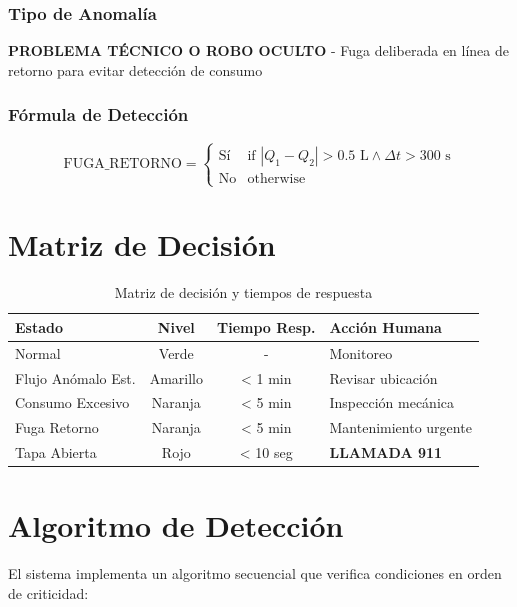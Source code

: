 \documentclass[12pt,a4paper,oneside]{report}
\begin{document}
\subsubsection{Tipo de Anomalía}

\textbf{PROBLEMA TÉCNICO O ROBO OCULTO} - Fuga deliberada en línea de retorno para evitar detección de consumo

\subsubsection{Fórmula de Detección}

\[
\text{FUGA\_RETORNO} = \begin{cases}
\text{Sí} & \text{if } |Q_1 - Q_2| > 0.5 \text{ L} \land \Delta t > 300 \text{ s} \\
\text{No} & \text{otherwise}
\end{cases}
\]

\section{Matriz de Decisión}

\begin{table}[H]
    \centering
    \begin{tabular}{|l|c|c|l|}
        \hline
        \textbf{Estado} & \textbf{Nivel} & \textbf{Tiempo Resp.} & \textbf{Acción Humana} \\
        \hline
        Normal & Verde & - & Monitoreo \\
        Flujo Anómalo Est. & Amarillo & < 1 min & Revisar ubicación \\
        Consumo Excesivo & Naranja & < 5 min & Inspección mecánica \\
        Fuga Retorno & Naranja & < 5 min & Mantenimiento urgente \\
        Tapa Abierta & Rojo & < 10 seg & \textbf{LLAMADA 911} \\
        \hline
    \end{tabular}
    \caption{Matriz de decisión y tiempos de respuesta}
\end{table}

\section{Algoritmo de Detección}

El sistema implementa un algoritmo secuencial que verifica condiciones en orden de criticidad:
\end{document}

